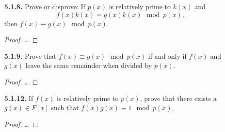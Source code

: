 \documentclass[12pt]{article}
\begin{document}
\begin{itemize}
\item[\textbf{5.1.8.}] Prove or disprove: If $p(x)$ is relatively prime to $k(x)$ and \[f(x)k(x)=g(x)k(x)\mod p(x),\] then $f(x)\equiv g(x)\mod p(x)$.
\begin{proof}
	\dots
\end{proof}

\item[\textbf{5.1.9.}] Prove that $f(x)\equiv g(x)\mod p(x)$ if and only if $f(x)$ and $g(x)$ leave the same remainder when divided by $p(x)$.
\begin{proof}
	\dots
\end{proof}

\item[\textbf{5.1.12.}] If $f(x)$ is relatively prime to $p(x)$, prove that there exists a $g(x)\in F[x]$ such that $f(x)g(x)\equiv 1\mod p(x)$.
\begin{proof}
	\dots
\end{proof}

\end{itemize}
\end{document}
